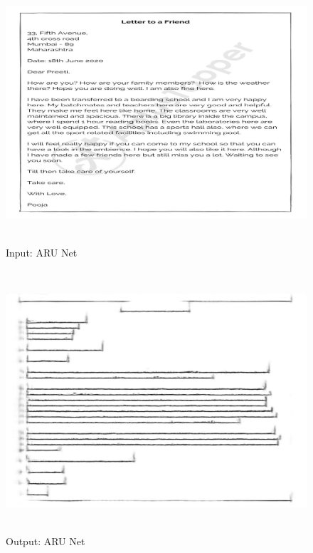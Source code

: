 \begin{figure}[H]
	\includegraphics[width=475pt,height=275pt]{in.jpg}
	\caption{Input: ARU Net}
\end{figure}

\begin{figure}[H]
	\includegraphics[width=475pt,height=275pt]{out.jpg}
	\caption{Output: ARU Net}
\end{figure}


